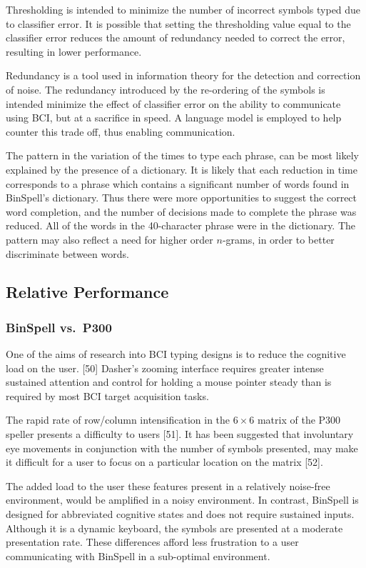 \documentclass[12pt,titlepage]{article}
\begin{document}
Thresholding is intended to minimize the number of incorrect symbols typed due to classifier 
error.  It is possible that setting the thresholding value equal to the classifier error reduces the 
amount of redundancy needed to correct the error, resulting in lower performance.

Redundancy is a tool used in information theory for the detection and correction of noise.  The 
redundancy introduced by the re-ordering of the symbols is intended minimize the effect of 
classifier error on the ability to communicate using BCI, but at a sacrifice in speed.  A language 
model is employed to help counter this trade off, thus enabling communication.

The pattern in the variation of the times to type each phrase, can be most likely explained by 
the presence of a dictionary.  It is likely that each reduction in time corresponds to a phrase 
which contains a significant number of words found in BinSpell's dictionary.  Thus there were 
more opportunities to suggest the correct word completion, and the number of decisions made 
to complete the phrase was reduced.  All of the words in the 40-character phrase were in the 
dictionary.  The pattern may also reflect a need for higher order $n$-grams, in order to better 
discriminate between words.

\subsection{Relative Performance}

\subsubsection{BinSpell vs.\ P300}

One of the aims of research into BCI typing designs is to reduce the cognitive load on the user.
[50]  Dasher's zooming interface requires greater intense sustained attention and control for 
holding a mouse pointer steady than is required by most BCI target acquisition tasks. 

The rapid rate of row/column intensification in the $6\times6$ matrix of the P300 speller presents a 
difficulty to users [51].  It has been suggested that involuntary eye movements in conjunction with 
the number of symbols presented, may make it difficult for a user to focus on a particular 
location on the matrix [52]. 

The added load to the user these features present in a relatively noise-free environment, would 
be amplified in a noisy environment.  In contrast, BinSpell is designed for abbreviated 
cognitive states and does not require sustained inputs.  Although it is a dynamic keyboard, the 
symbols are presented at a moderate presentation rate.  These differences afford less frustration 
to a user communicating with BinSpell in a sub-optimal environment.
\end{document}
